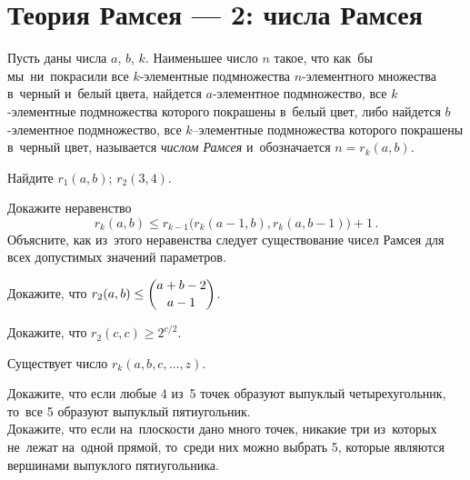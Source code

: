 
\section*{Теория Рамсея --- 2: числа Рамсея}


Пусть даны числа $a$, $b$, $k$.
Наименьшее число $n$ такое, что как~бы мы~ни~покрасили все
$k$-элементные подмножества $n$-элементного множества в~черный и~белый цвета,
найдется $a$-элементное подмножество, все $k$-элементные подмножества
которого покрашены в~белый цвет, либо найдется $b$-элементное подмножество,
все $k$--элементные подмножества которого покрашены в~черный цвет, называется
\emph{числом Рамсея} и~обозначается $n = r_k(a, b)$.

\begin{problems}

\item
Найдите
\quad
\subproblem $r_1(a, b)$;
\quad
\subproblem $r_2(3, 4)$.

\item
Докажите неравенство
\[
    r_{k}(a, b)
\leq
    r_{k-1} \bigl( r_{k}(a - 1, b), r_k(a, b - 1) \bigr) + 1
\,.\]
Объясните, как из~этого неравенства следует существование чисел Рамсея для всех
допустимых значений параметров. 

\item
Докажите, что
\(
    r_2(a, b) \leq \dbinom{a + b - 2}{a - 1}
\)\;. 

\item
Докажите, что $r_2(c, c) \geq 2^{c / 2}$. 

\item{}
Существует число $r_k(a, b, c, \ldots, z)$.  


\item{}
\subproblem
Докажите, что если любые 4 из~5 точек образуют выпуклый четырехугольник,
то~все 5 образуют выпуклый пятиугольник.
\\
\subproblem
Докажите, что если на~плоскости дано много точек, никакие три из~которых
не~лежат на~одной прямой, то~среди них можно выбрать 5, которые являются
вершинами выпуклого пятиугольника.

\end{problems}

